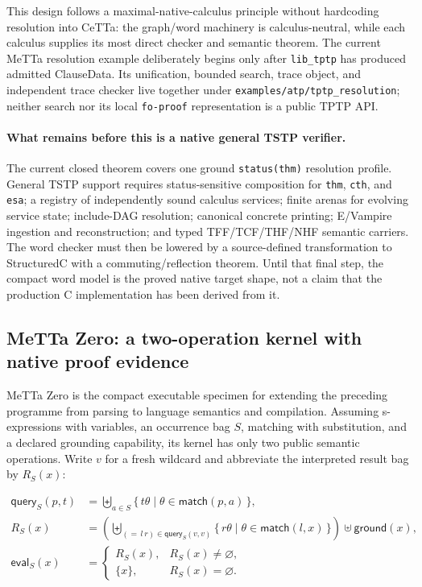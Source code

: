 \documentclass[11pt]{article}
\newcommand{\code}[1]{\texttt{#1}}
\newcommand{\CeTTa}{\textup{CeTTa}}
\begin{document}
This design follows a maximal-native-calculus principle without hardcoding
resolution into \CeTTa{}: the graph/word machinery is calculus-neutral, while
each calculus supplies its most direct checker and semantic theorem.  The
current MeTTa resolution example deliberately begins only after
\code{lib\_tptp} has produced admitted ClauseData.  Its unification, bounded
search, trace object, and independent trace checker live together under
\code{examples/atp/tptp\_resolution}; neither search nor its local
\code{fo-proof} representation is a public TPTP API.

\paragraph{What remains before this is a native general TSTP verifier.}
The current closed theorem covers one ground \code{status(thm)} resolution
profile.  General TSTP support requires status-sensitive composition for
\code{thm}, \code{cth}, and \code{esa}; a registry of independently sound
calculus services; finite arenas for evolving service state; include-DAG
resolution; canonical concrete printing; E/Vampire ingestion and
reconstruction; and typed TFF/TCF/THF/NHF semantic carriers.  The word
checker must then be lowered by a source-defined transformation to StructuredC
with a commuting/reflection theorem.  Until that final step, the compact word
model is the proved native target shape, not a claim that the production C
implementation has been derived from it.

\subsection{MeTTa Zero: a two-operation kernel with native proof evidence}
\label{sec:zero-oslf-nik}

MeTTa Zero is the compact executable specimen for extending the preceding
programme from parsing to language semantics and compilation.  Assuming
s-expressions with variables, an occurrence bag $S$, matching with
substitution, and a declared grounding capability, its kernel has only two
public semantic operations.  Write $v$ for a fresh wildcard and abbreviate
the interpreted result bag by $R_S(x)$:

\begin{align}
\mathsf{query}_S(p,t)
  &= \biguplus_{a\in S}
       \{\,t\theta \mid \theta\in\mathsf{match}(p,a)\,\},
       \label{eq:zero-query}\\
R_S(x)
  &= \left(\biguplus_{(=\,l\,r)\in\mathsf{query}_S(v,v)}
       \{\,r\theta \mid \theta\in\mathsf{match}(l,x)\,\}\right)
       \uplus \mathsf{ground}(x),
       \label{eq:zero-results}\\
\mathsf{eval}_S(x)
  &= \begin{cases}
       R_S(x), & R_S(x)\neq\varnothing,\\
       \{x\},  & R_S(x)=\varnothing.
     \end{cases}
     \label{eq:zero-eval}
\end{align}
\end{document}
